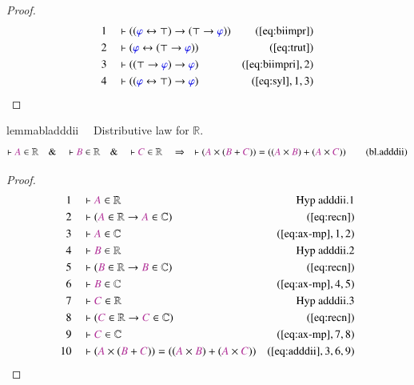 \begin{proof}
\begin{align}
  1 &&  & \vdash ( ( \mw{\varphi} \leftrightarrow \top ) \rightarrow ( \top
      \rightarrow \mw{\varphi} )
      )&(\mbox{\ref{eq:biimpr}})\notag
  \\ 2 &&  & \vdash ( \mw{\varphi} \leftrightarrow ( \top \rightarrow
      \mw{\varphi} ) )&(\mbox{\ref{eq:trut}})\notag
  \\ 3 &&  & \vdash ( ( \top \rightarrow \mw{\varphi} ) \rightarrow
      \mw{\varphi} )&(\mbox{\ref{eq:biimpri}},2)\notag
  \\ 4 &&  & \vdash ( ( \mw{\varphi} \leftrightarrow \top ) \rightarrow
      \mw{\varphi} )&(\mbox{\ref{eq:syl}},1,3)\notag
\end{align}
\end{proof}

\begin{restatable}{lemma}{bladddii}~~ Distributive law for $\mathbb{R}$.
\begin{align}
\vdash \mc{A} \in \mathbb{R}\quad\&\quad \vdash \mc{B} \in
    \mathbb{R}\quad\&\quad \vdash \mc{C} \in \mathbb{R}\quad\Rightarrow\quad
    \vdash ( \mc{A} \times ( \mc{B} + \mc{C} ) ) = ( ( \mc{A} \times \mc{B} ) + (
    \mc{A} \times \mc{C} ) )\label{eq:bl.adddii}\tag{bl.adddii}
\end{align}
\end{restatable}

\begin{proof}
\begin{align}
  1 &&  & \vdash \mc{A} \in \mathbb{R}&\text{Hyp~adddii.1}\notag%
  \\ 2 &&  & \vdash ( \mc{A} \in \mathbb{R} \rightarrow \mc{A} \in \mathbb{C}
      )&(\mbox{\ref{eq:recn}})\notag
  \\ 3 &&  & \vdash \mc{A} \in \mathbb{C}&(\mbox{\ref{eq:ax-mp}},1,2)\notag
  \\ 4 &&  & \vdash \mc{B} \in \mathbb{R}&\text{Hyp~adddii.2}\notag%
  \\ 5 &&  & \vdash ( \mc{B} \in \mathbb{R} \rightarrow \mc{B} \in \mathbb{C}
      )&(\mbox{\ref{eq:recn}})\notag
  \\ 6 &&  & \vdash \mc{B} \in \mathbb{C}&(\mbox{\ref{eq:ax-mp}},4,5)\notag
  \\ 7 &&  & \vdash \mc{C} \in \mathbb{R}&\text{Hyp~adddii.3}\notag%
  \\ 8 &&  & \vdash ( \mc{C} \in \mathbb{R} \rightarrow \mc{C} \in \mathbb{C}
      )&(\mbox{\ref{eq:recn}})\notag
  \\ 9 &&  & \vdash \mc{C} \in \mathbb{C}&(\mbox{\ref{eq:ax-mp}},7,8)\notag
  \\ 10 &&  & \vdash ( \mc{A} \times ( \mc{B} + \mc{C} ) ) = ( ( \mc{A} \times
      \mc{B} ) + ( \mc{A} \times \mc{C} )
      )&(\mbox{\ref{eq:adddii}},3,6,9)\notag
\end{align}
\end{proof}

